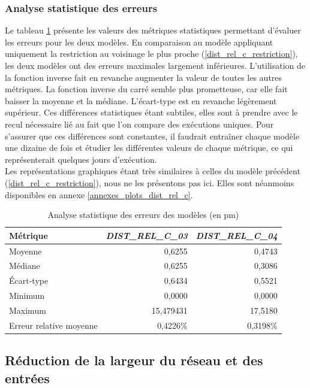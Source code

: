 \subsubsection{Analyse statistique des erreurs}

Le tableau \ref{tstats_dist_rel_c_023} présente les valeurs des métriques statistiques permettant d'évaluer les erreurs pour les deux modèles. En comparaison au modèle appliquant uniquement la restriction au voisinage le plus proche (\ref{dist_rel_c_restriction}), les deux modèles ont des erreurs maximales largement inférieures. L'utilisation de la fonction inverse fait en revanche augmenter la valeur de toutes les autres métriques. La fonction inverse du carré semble plus prometteuse, car elle fait baisser la moyenne et la médiane. L'écart-type est en revanche légèrement supérieur. Ces différences statistiques étant subtiles, elles sont à prendre avec le recul nécessaire lié au fait que l'on compare des exécutions uniques. Pour s'assurer que ces différences sont constantes, il faudrait entraîner chaque modèle une dizaine de fois et étudier les différentes valeurs de chaque métrique, ce qui représenterait quelques jours d'exécution.\\

Les représentations graphiques étant très similaires à celles du modèle précédent (\ref{dist_rel_c_restriction}), nous ne les présentons pas ici. Elles sont néanmoins disponibles en annexe \ref{annexes_plots_dist_rel_c}.

\begin{table}
	\centering
	\begin{tabular}{|l|r|r|}
		\hline
		\textbf{Métrique}& \textbf{\emph{DIST\_REL\_C\_03}} & \textbf{\emph{DIST\_REL\_C\_04}} \\ \hline
		Moyenne & 0,6255 & 0,4743\\ \hline
		Médiane & 0,6255 & 0,3086 \\ \hline
		Écart-type & 0,6434 & 0,5521 \\ \hline
		Minimum & 0,0000 & 0,0000\\ \hline
		Maximum & 15,479431 & 17,5180\\ \hline
		Erreur relative moyenne & 0,4226\% & 0,3198\%\\ \hline
	\end{tabular}
	
	\caption{Analyse statistique des erreurs des modèles (en pm)}
	\label{tstats_dist_rel_c_023}
\end{table}

\subsection{Réduction de la largeur du réseau et des entrées}

